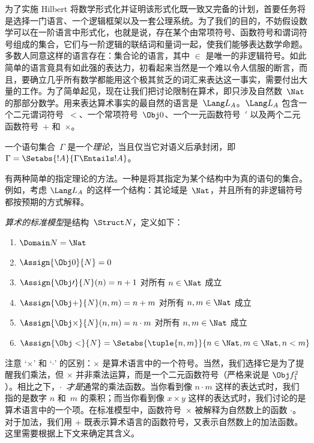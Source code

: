 \documentclass[../../../include/open-logic-section]{subfiles}
\begin{document}


为了实施 Hilbert 将数学形式化并证明该形式化既一致又完备的计划，首要任务将是选择一门语言、一个逻辑框架以及一套公理系统。为了我们的目的，不妨假设数学可以在一阶语言中形式化，也就是说，存在某个由常项符号、函数符号和谓词符号组成的集合，它们与一阶逻辑的联结词和量词一起，使我们能够表达数学命题。多数人同意这样的语言存在：集合论的语言，其中 $\in$ 是唯一的非逻辑符号。如此简单的语言竟具有如此强的表达力，初看起来当然是一个难以令人信服的断言，而且，要确立几乎所有数学都能用这个极其贫乏的词汇来表达这一事实，需要付出大量的工作。为了简单起见，现在让我们把讨论限制在算术，即只涉及自然数~$\Nat$ 的那部分数学。用来表达算术事实的最自然的语言是~$\Lang L_A$。$\Lang L_A$ 包含一个二元谓词符号~$<$、一个常项符号~$\Obj 0$、一个一元函数符号~$\prime$ 以及两个二元函数符号~$+$ 和~$\times$。

\begin{defn}
一个语句集合~$\Gamma$ 是一个\emph{理论}，当且仅当它对语义后承封闭，即 $\Gamma = \Setabs{!A}{\Gamma \Entails
!A}$。
\end{defn}

有两种简单的指定理论的方法。一种是将其指定为某个结构中为真的语句的集合。例如，考虑 $\Lang L_A$ 的这样一个结构：其论域是~$\Nat$，并且所有的非逻辑符号都按预期的方式解释。

\begin{defn}
\emph{算术的标准模型}是结构~$\Struct N$，定义如下：
\begin{enumerate}
\item $\Domain N = \Nat$
\item $\Assign{\Obj 0}{N} = 0$
\item $\Assign{\Obj \prime}{N}(n) = n + 1$ 对所有 $n \in \Nat$ 成立
\item $\Assign{\Obj +}{N}(n, m) = n + m$ 对所有 $n, m \in \Nat$ 成立
\item $\Assign{\Obj \times}{N}(n, m) = n\cdot m$ 对所有 $n, m \in \Nat$ 成立
\item $\Assign{\Obj <}{N} = \Setabs{\tuple{n, m}}{n \in \Nat, m \in
  \Nat, n < m}$
\end{enumerate}
\end{defn}

注意 `$\times$' 和 `$\cdot$' 的区别：$\times$ 是算术语言中的一个符号。当然，我们选择它是为了提醒我们乘法，但 $\times$ 并非乘法运算，而是一个二元函数符号（严格来说是 $\Obj f^2_1$）。相比之下，$\cdot$~\emph{才是}通常的乘法函数。当你看到像 $n \cdot m$ 这样的表达式时，我们指的是数字 $n$ 和~$m$ 的乘积；而当你看到像 $x \times y$ 这样的表达式时，我们讨论的是算术语言中的一个项。在标准模型中，函数符号~$\times$ 被解释为自然数上的函数 $\cdot$。对于加法，我们用 $+$ 既表示算术语言的函数符号，又表示自然数上的加法函数。这里需要根据上下文来确定其含义。
\end{document}
